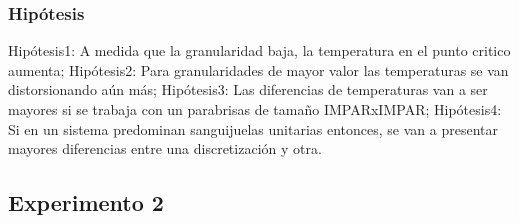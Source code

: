\subsubsection{Hipótesis}

Hipótesis1: A medida que la granularidad baja, la temperatura en el punto critico aumenta;\newline
Hipótesis2: Para granularidades de mayor valor las temperaturas se van distorsionando aún más;\newline
Hipótesis3: Las diferencias de temperaturas van a ser mayores si se trabaja con un parabrisas de tamaño IMPARxIMPAR;\newline
Hipótesis4: Si en un sistema predominan sanguijuelas unitarias entonces, se van a presentar mayores diferencias entre una discretización y otra.\newline





\subsection{Experimento 2}
